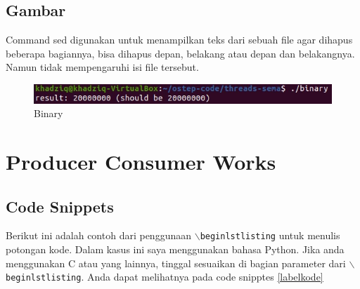 \documentclass[11pt,a4paper]{article}
\begin{document}
\subsection{Gambar}
    Command sed digunakan untuk menampilkan teks dari sebuah file agar dihapus beberapa bagiannya, bisa dihapus depan, belakang atau depan dan belakangnya. Namun tidak mempengaruhi isi file tersebut.
    \begin{figure}[h]
        \centering
        \includegraphics[scale = 0.9]{Figure/binary.png}
        \caption{Binary}
        \label{fig:tut2_1}
    \end{figure}
\section{Producer Consumer Works}
\subsection{Code Snippets}
    Berikut ini adalah contoh dari penggunaan $\backslash${\tt{begin{lstlisting}}} untuk menulis potongan kode. Dalam kasus ini saya menggunakan bahasa Python. Jika anda menggunakan C atau yang lainnya, tinggal sesuaikan di bagian parameter dari $\backslash${\tt{begin{lstlisting}}}. Anda dapat melihatnya pada code snipptes \ref{labelkode}
    
\end{document}
